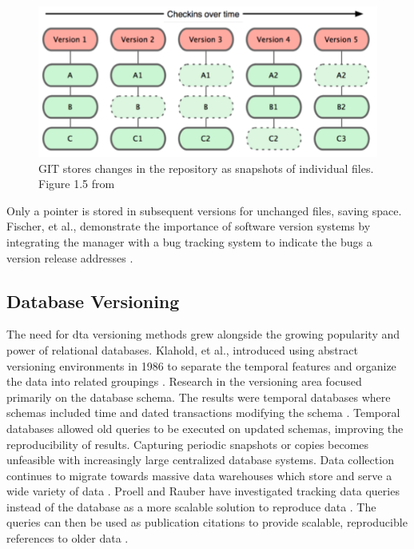 \begin{figure}
	\centering
	\includegraphics[scale=0.50]{figures/GITFiles.png}
	\caption[GIT stores changes in the repository as snapshots of individual files.]{GIT stores changes in the repository as snapshots of individual files. Figure 1.5 from \cite{Chacon:2009:PG:1618548}}
	\label{GITFile}
\end{figure}
Only a pointer is stored in subsequent versions for unchanged files, saving space.
Fischer, et al., demonstrate the importance of software version systems by integrating the manager with a bug tracking system to indicate the bugs a version release addresses \cite{Fischer2003}.

\subsection{Database Versioning}

The need for dta versioning methods grew alongside the growing popularity and power of relational databases.
Klahold, et al., introduced using abstract versioning environments in 1986 to separate the temporal features and organize the data into related groupings \cite{Klahold:1986:GMV:645913.671314}.
Research in the versioning area focused primarily on the database schema.
The results were temporal databases where schemas included time and dated transactions modifying the schema \cite{roddick1996model}.
Temporal databases allowed old queries to be executed on updated schemas, improving the reproducibility of results.
Capturing periodic snapshots or copies becomes unfeasible with increasingly large centralized database systems.
Data collection continues to migrate towards massive data warehouses which store and serve a wide variety of data \cite{Vassiliadis1999}.
Proell and Rauber have investigated tracking data queries instead of the database as a more scalable solution to reproduce data \cite{proellBigData}.
The queries can then be used as publication citations to provide scalable, reproducible references to older data \cite{Proell2013} \cite{DBLP:conf/data/2013}.

